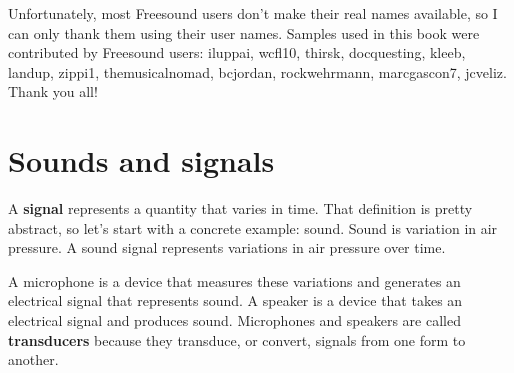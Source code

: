 \documentclass[12pt]{book} \usepackage[width=5.5in,height=8.5in, hmarginratio=3:2,vmarginratio=1:1]{geometry}
\begin{document}
Unfortunately, most Freesound users don't make their real names available, so I can only thank them using their user names. Samples used in this book were contributed by Freesound users: iluppai, wcfl10, thirsk, docquesting, kleeb, landup, zippi1, themusicalnomad, bcjordan, rockwehrmann, marcgascon7, jcveliz. Thank you all! 

\normalsize

\clearemptydoublepage

\begin{latexonly} 

\tableofcontents

\clearemptydoublepage

\end{latexonly} 

\mainmatter

\chapter{Sounds and signals} \label{sounds} 

A {\bf signal} represents a quantity that varies in time. That definition is pretty abstract, so let's start with a concrete example: sound. Sound is variation in air pressure. A sound signal represents variations in air pressure over time. 

A microphone is a device that measures these variations and generates an electrical signal that represents sound. A speaker is a device that takes an electrical signal and produces sound. Microphones and speakers are called {\bf transducers} because they transduce, or convert, signals from one form to another. 
\end{document}
